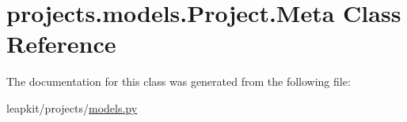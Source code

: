 \hypertarget{classprojects_1_1models_1_1_project_1_1_meta}{\section{projects.\-models.\-Project.\-Meta Class Reference}
\label{classprojects_1_1models_1_1_project_1_1_meta}
}


The documentation for this class was generated from the following file\-:\begin{DoxyCompactItemize}
\item 
leapkit/projects/\hyperlink{projects_2models_8py}{models.\-py}\end{DoxyCompactItemize}
